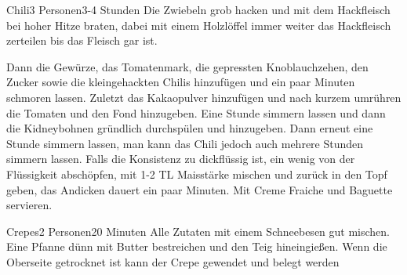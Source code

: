 
\begin{recipe}{Chili}{3 Personen}{3-4 Stunden}
Die Zwiebeln grob hacken und mit dem Hackfleisch bei hoher Hitze braten, dabei mit einem Holzlöffel immer weiter das Hackfleisch zerteilen bis das Fleisch gar ist.

Dann die Gewürze, das Tomatenmark, die gepressten Knoblauchzehen, den Zucker sowie die kleingehackten Chilis hinzufügen und ein paar Minuten schmoren lassen. Zuletzt das Kakaopulver hinzufügen und nach kurzem umrühren die Tomaten und den Fond hinzugeben. Eine Stunde simmern lassen und dann die Kidneybohnen gründlich durchspülen und hinzugeben. Dann erneut eine Stunde simmern lassen, man kann das Chili jedoch auch mehrere Stunden simmern lassen. Falls die Konsistenz zu dickflüssig ist, ein wenig von der Flüssigkeit abschöpfen, mit 1-2 TL Maisstärke mischen und zurück in den Topf geben, das Andicken dauert ein paar Minuten.
Mit Creme Fraiche und Baguette servieren.
\end{recipe}


\begin{recipe}{Crepes}{2 Personen}{20 Minuten}
Alle Zutaten mit einem Schneebesen gut mischen.
Eine Pfanne dünn mit Butter bestreichen und den Teig hineingießen. Wenn die Oberseite getrocknet ist kann der Crepe gewendet und belegt werden
\end{recipe}


